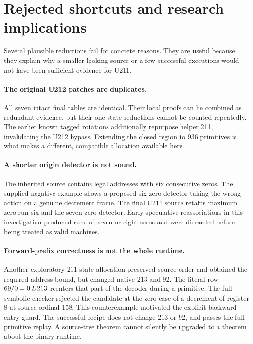 \section{Rejected shortcuts and research implications}
\label{sec:research}

Several plausible reductions fail for concrete reasons. They are useful
because they explain why a smaller-looking source or a few successful
executions would not have been sufficient evidence for U211.

\paragraph{The original U212 patches are duplicates.}
All seven intact final tables are identical. Their local proofs can be
combined as redundant evidence, but their one-state reductions cannot be
counted repeatedly. The earlier known tagged rotations additionally
repurpose helper 211, invalidating the U212 bypass. Extending the closed
region to 936 primitives is what makes a different, compatible allocation
available here.

\paragraph{A shorter origin detector is not sound.}
The inherited source contains legal addresses with six consecutive zeros.
The supplied negative example shows a proposed six-zero detector taking
the wrong action on a genuine decrement frame. The final U211 source
retains maximum zero run six and the seven-zero detector. Early speculative
reassociations in this investigation produced runs of seven or eight zeros
and were discarded before being treated as valid machines.

\paragraph{Forward-prefix correctness is not the whole runtime.}
Another exploratory 211-state allocation preserved source order and obtained
the required address bound, but changed native 213 and 92. The literal row
$69/0=0\,L\,213$ reenters that part of the decoder during a primitive.
The full symbolic checker rejected the candidate at the zero case of a
decrement of register 8 at source ordinal 158. This counterexample motivated
the explicit backward-entry guard. The successful recipe does not change
213 or 92, and passes the full primitive replay. A source-tree theorem
cannot silently be upgraded to a theorem about the binary runtime.

